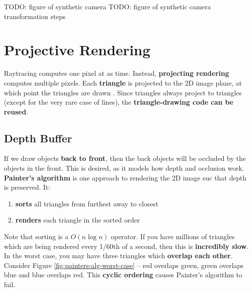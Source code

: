 \documentclass{article}
\begin{document}
TODO: figure of synthetic camera
TODO: figure of synthetic camera transformation steps

\section{Projective Rendering}

Raytracing computes one pixel at as time. Instead, \textbf{projecting rendering} computes multiple pixels. Each \textbf{triangle} is projected to the 2D image plane, at which point the triangles are drawn . Since triangles always project to triangles (except for the very rare case of lines), the \textbf{triangle-drawing code can be reused}.

\subsection{Depth Buffer}

If we draw objects \textbf{back to front}, then the back objects will be occluded by the objects in the front. This is desired, as it models how depth and occlusion work. \textbf{Painter's algorithm} is one approach to rendering the 2D image suc that depth is preserved. It:
\begin{enumerate}
	\item \textbf{sorts} all triangles from furthest away to closest
	\item \textbf{renders} each triangle in the sorted order 
\end{enumerate}
Note that sorting is a $O(n \log n)$ operator. If you have millions of triangles which are being rendered every 1/60th of a second, then this is \textbf{incredibly slow}. In the worst case, you may have three triangles which \textbf{overlap each other}. Consider Figure \ref{fig:painters-alg-worst-case} -- red overlaps green, green overlaps blue and blue overlaps red. This \textbf{cyclic ordering} causes Painter's algorithm to fail.
\end{document}
